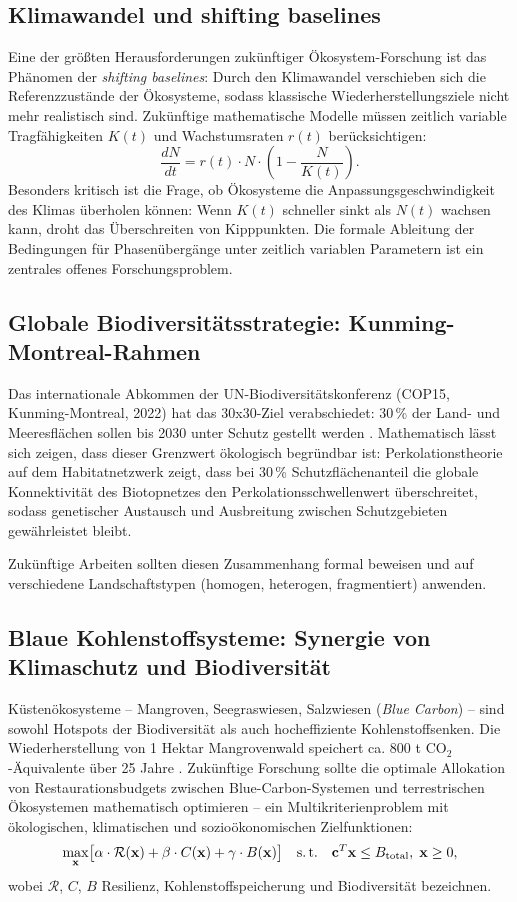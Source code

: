 ﻿\documentclass[a4paper,12pt]{article}
\theoremstyle{definition}
\begin{document}
\subsection{Klimawandel und shifting baselines}

Eine der größten Herausforderungen zukünftiger Ökosystem-Forschung ist das Phänomen der \emph{shifting baselines}: Durch den Klimawandel verschieben sich die Referenzzustände der Ökosysteme, sodass klassische Wiederherstellungsziele nicht mehr realistisch sind. Zukünftige mathematische Modelle müssen zeitlich variable Tragfähigkeiten $K(t)$ und Wachstumsraten $r(t)$ berücksichtigen:
\[
\frac{dN}{dt} = r(t) \cdot N \cdot \left(1 - \frac{N}{K(t)}\right).
\]
Besonders kritisch ist die Frage, ob Ökosysteme die Anpassungsgeschwindigkeit des Klimas überholen können: Wenn $K(t)$ schneller sinkt als $N(t)$ wachsen kann, droht das Überschreiten von Kipppunkten. Die formale Ableitung der Bedingungen für Phasenübergänge unter zeitlich variablen Parametern ist ein zentrales offenes Forschungsproblem.

\subsection{Globale Biodiversitätsstrategie: Kunming-Montreal-Rahmen}

Das internationale Abkommen der UN-Biodiversitätskonferenz (COP15, Kunming-Montreal, 2022) hat das 30x30-Ziel verabschiedet: 30\,\% der Land- und Meeresflächen sollen bis 2030 unter Schutz gestellt werden \cite{unep2022kunming}. Mathematisch lässt sich zeigen, dass dieser Grenzwert ökologisch begründbar ist: Perkolationstheorie auf dem Habitatnetzwerk zeigt, dass bei 30\,\% Schutzflächenanteil die globale Konnektivität des Biotopnetzes den Perkolationsschwellenwert überschreitet, sodass genetischer Austausch und Ausbreitung zwischen Schutzgebieten gewährleistet bleibt.

Zukünftige Arbeiten sollten diesen Zusammenhang formal beweisen und auf verschiedene Landschaftstypen (homogen, heterogen, fragmentiert) anwenden.

\subsection{Blaue Kohlenstoffsysteme: Synergie von Klimaschutz und Biodiversität}

Küstenökosysteme -- Mangroven, Seegraswiesen, Salzwiesen (\emph{Blue Carbon}) -- sind sowohl Hotspots der Biodiversität als auch hocheffiziente Kohlenstoffsenken. Die Wiederherstellung von 1 Hektar Mangrovenwald speichert ca. 800 t $\mathrm{CO}_2$-Äquivalente über 25 Jahre \cite{donato2011mangroves}. Zukünftige Forschung sollte die optimale Allokation von Restaurationsbudgets zwischen Blue-Carbon-Systemen und terrestrischen Ökosystemen mathematisch optimieren -- ein Multikriterienproblem mit ökologischen, klimatischen und sozioökonomischen Zielfunktionen:
\[
\max_{\mathbf{x}} \bigl[\alpha \cdot \mathcal{R}(\mathbf{x}) + \beta \cdot C(\mathbf{x}) + \gamma \cdot B(\mathbf{x})\bigr]
\quad \text{s.\,t.} \quad \mathbf{c}^T \mathbf{x} \leq B_{\text{total}},\; \mathbf{x} \geq 0,
\]
wobei $\mathcal{R}$, $C$, $B$ Resilienz, Kohlenstoff\-speicherung und Biodiversität bezeichnen.
\end{document}

